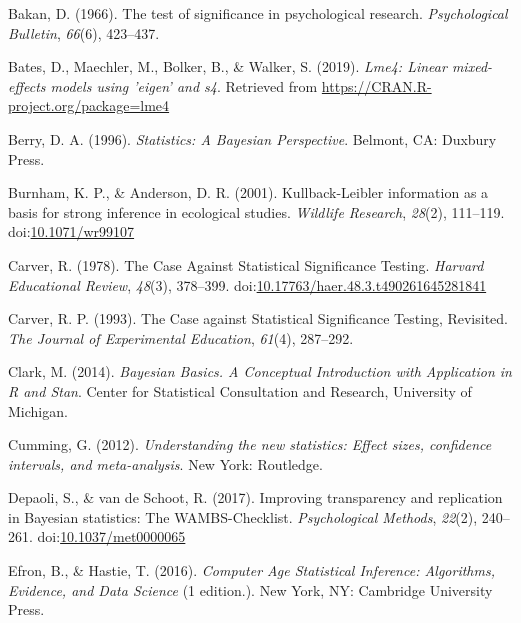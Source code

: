 \documentclass[doc]{apa6}
\begin{document}
\hypertarget{ref-bakanTestSignificancePsychological1966}{}
Bakan, D. (1966). The test of significance in psychological research.
\emph{Psychological Bulletin}, \emph{66}(6), 423--437.

\hypertarget{ref-R-lme4}{}
Bates, D., Maechler, M., Bolker, B., \& Walker, S. (2019). \emph{Lme4:
Linear mixed-effects models using 'eigen' and s4}. Retrieved from
\url{https://CRAN.R-project.org/package=lme4}

\hypertarget{ref-BerryStatisticsBayesianPerspective1996}{}
Berry, D. A. (1996). \emph{Statistics: A Bayesian Perspective}. Belmont,
CA: Duxbury Press.

\hypertarget{ref-BurnhamKullbackLeiblerinformationbasis2001}{}
Burnham, K. P., \& Anderson, D. R. (2001). Kullback-Leibler information
as a basis for strong inference in ecological studies. \emph{Wildlife
Research}, \emph{28}(2), 111--119.
doi:\href{https://doi.org/10.1071/wr99107}{10.1071/wr99107}

\hypertarget{ref-carverCaseStatisticalSignificance1978}{}
Carver, R. (1978). The Case Against Statistical Significance Testing.
\emph{Harvard Educational Review}, \emph{48}(3), 378--399.
doi:\href{https://doi.org/10.17763/haer.48.3.t490261645281841}{10.17763/haer.48.3.t490261645281841}

\hypertarget{ref-carverCaseStatisticalSignificance1993}{}
Carver, R. P. (1993). The Case against Statistical Significance Testing,
Revisited. \emph{The Journal of Experimental Education}, \emph{61}(4),
287--292.

\hypertarget{ref-ClarkBayesianBasicsConceptual2014}{}
Clark, M. (2014). \emph{Bayesian Basics. A Conceptual Introduction with
Application in R and Stan}. Center for Statistical Consultation and
Research, University of Michigan.

\hypertarget{ref-CummingUnderstandingnewstatistics2012}{}
Cumming, G. (2012). \emph{Understanding the new statistics: Effect
sizes, confidence intervals, and meta-analysis}. New York: Routledge.

\hypertarget{ref-depaoliImprovingTransparencyReplication2017}{}
Depaoli, S., \& van de Schoot, R. (2017). Improving transparency and
replication in Bayesian statistics: The WAMBS-Checklist.
\emph{Psychological Methods}, \emph{22}(2), 240--261.
doi:\href{https://doi.org/10.1037/met0000065}{10.1037/met0000065}

\hypertarget{ref-efronComputerAgeStatistical2016}{}
Efron, B., \& Hastie, T. (2016). \emph{Computer Age Statistical
Inference: Algorithms, Evidence, and Data Science} (1 edition.). New
York, NY: Cambridge University Press.
\end{document}
